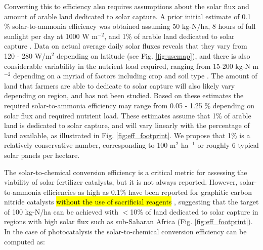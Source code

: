 Converting this to efficiency also requires assumptions about the solar flux and amount of arable land dedicated to solar capture. A prior initial estimate of 0.1 \% solar-to-ammonia efficiency was obtained assuming 50 kg-N/ha, 8 hours of full sunlight per day at 1000 W m$^{-2}$, and 1\% of arable land dedicated to solar capture \cite{Medford_2017}. Data on actual average daily solar fluxes reveals that they vary from 120 - 280 W/m$^2$ depending on latitude \cite{MacKay_2013} (see Fig. \ref{fig:usemap}), and there is also considerable variability in the nutrient load required, ranging from 15-200 kg-N m$^{-2}$ depending on a myriad of factors including crop and soil type \cite{FAOSTAT_2018}. The amount of land that farmers are able to dedicate to solar capture will also likely vary depending on region, and has not been studied. Based on these estimates the required solar-to-ammonia efficiency may range from 0.05 - 1.25 \% depending on solar flux and required nutrient load. These estimates assume that 1\% of arable land is dedicated to solar capture, and will vary linearly with the percentage of land available, as illustrated in Fig. \ref{fig:eff_footprint}. We propose that 1\% is a relatively conservative number, corresponding to 100 m$^2$ ha$^{-1}$ or roughly 6 typical solar panels per hectare.

The solar-to-chemical conversion efficiency is a critical metric for assessing the viability of solar fertilizer catalysts, but it is not always reported. However, solar-to-ammonia efficiencies as high as 0.1\% have been reported for graphitic carbon nitride catalysts \hl{without the use of sacrificial reagents} \cite{Shiraishi_2018}, suggesting that the target of 100 kg-N/ha can be achieved with $<$10\% of land dedicated to solar capture in regions with high solar flux such as sub-Saharan Africa (Fig. \ref{fig:eff_footprint}). In the case of photocatalysis the solar-to-chemical conversion efficiency can be computed as:

